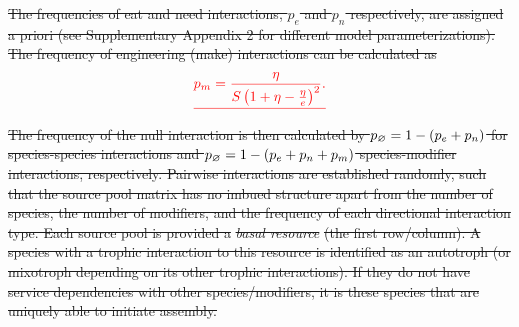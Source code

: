 \documentclass[twocolumn,preprintnumbers,amsmath,amssymb,superscriptaddress,linenumbers]{revtex4-1}
\newcommand{\rr}[1]{{\rm #1}}
\providecommand{\DIFdel}[1]{{\protect\color{red}\sout{#1}}}                      %
\begin{document}
\DIFdel{The frequencies of eat and need interactions, $p_e$ and $p_n$ respectively, are assigned a priori (see Supplementary Appendix 2 for different model parameterizations).
The frequency of engineering (make) interactions can be calculated as
}\begin{displaymath}
\DIFdel{p_m = \frac{\eta}{S\left(1 + \eta - \frac{\eta}{e}\right)^2}.
}\end{displaymath}%
\DIFdel{The frequency of the null interaction is then calculated by $p_\rr{\varnothing} = 1 - (p_e + p_n)$ for species-species interactions and $p_\rr{\varnothing} = 1 - (p_e + p_n+ p_m)$ species-modifier interactions, respectively.
Pairwise interactions are established randomly, such that the source pool matrix has no imbued structure apart from the number of species, the number of modifiers, and the frequency of each directional interaction type.
Each source pool is provided a }\emph{\DIFdel{basal resource}} %
\DIFdel{(the first row/column).
A species with a trophic interaction to this resource is identified as an autotroph (or mixotroph depending on its other trophic interactions).
If they do not have service dependencies with other species/modifiers, it is these species that are uniquely able to initiate assembly.
}%
\end{document}
